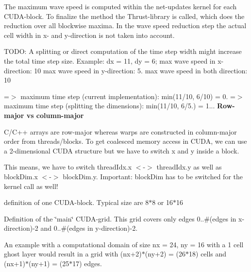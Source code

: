The maximum wave speed is computed within the net-\/updates kernel for each C\-U\-D\-A-\/block. To finalize the method the Thrust-\/library is called, which does the reduction over all blockwise maxima. In the wave speed reduction step the actual cell width in x-\/ and y-\/direction is not taken into account.

T\-O\-D\-O\-: A splitting or direct computation of the time step width might increase the total time step size. Example\-: dx = 11, dy = 6; max wave speed in x-\/direction\-: 10 max wave speed in y-\/direction\-: 5. max wave speed in both direction\-: 10

=$>$ maximum time step (current implementation)\-: min(11/10, 6/10) = 0. =$>$ maximum time step (splitting the dimensions)\-: min(11/10, 6/5.) = 1... {\bfseries Row-\/major vs column-\/major}

C/\-C++ arrays are row-\/major whereas warps are constructed in column-\/major order from threads/blocks. To get coalesced memory access in C\-U\-D\-A, we can use a 2-\/dimensional C\-U\-D\-A structure but we have to switch x and y inside a block.

This means, we have to switch thread\-Idx.\-x $<$-\/$>$ thread\-Idx.\-y as well as block\-Dim.\-x $<$-\/$>$ block\-Dim.\-y. Important\-: block\-Dim has to be switched for the kernel call as well!

definition of one C\-U\-D\-A-\/block. Typical size are 8$\ast$8 or 16$\ast$16

Definition of the \char`\"{}main\char`\"{} C\-U\-D\-A-\/grid. This grid covers only edges 0..\#(edges in x-\/direction)-\/2 and 0..\#(edges in y-\/direction)-\/2.

An example with a computational domain of size nx = 24, ny = 16 with a 1 cell ghost layer would result in a grid with (nx+2)$\ast$(ny+2) = (26$\ast$18) cells and (nx+1)$\ast$(ny+1) = (25$\ast$17) edges.

